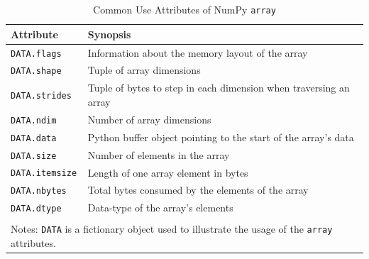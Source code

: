 \documentclass[a4paper,11pt]{book}
\begin{document}
\begin{table}[!htbp]
	\centering
	\caption{Common Use Attributes of NumPy \texttt{array}}
	\label{tab:array_attributes}
	\begin{tabular}{ll}
		\toprule \toprule
			Attribute & Synopsis \\
			\midrule 
                        \texttt{DATA.flags} &
                        Information about the memory layout of the array \\
                        \texttt{DATA.shape} &
                        Tuple of array dimensions\\
                        \texttt{DATA.strides}&
                        Tuple of bytes to step in each dimension when traversing an array\\
                        \texttt{DATA.ndim}&
                        Number of array dimensions\\
                        \texttt{DATA.data}&
                        Python buffer object pointing to the start of the array's data\\
                        \texttt{DATA.size}&
                        Number of elements in the array\\
                        \texttt{DATA.itemsize}&
                        Length of one array element in bytes\\
                        \texttt{DATA.nbytes}&
                        Total bytes consumed by the elements of the array\\
			\texttt{DATA.dtype}&
			Data-type of the array's elements\\
     			\bottomrule \\[-1.8ex]
			\multicolumn{2}{l}{Notes: \texttt{DATA} is a fictionary object used to illustrate the usage of the \texttt{array} attributes.} \\
	\end{tabular}
\end{table}
\clearpage 
\end{document}
